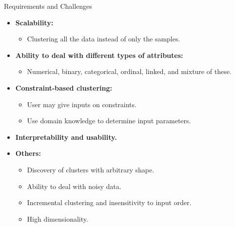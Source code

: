 \begin{frame}{Requirements and Challenges}
	\begin{itemize}
		\item \textbf{Scalability:}
		      \begin{itemize}
			      \item Clustering all the data instead of only the samples.
		      \end{itemize}
		\item \textbf{Ability to deal with different types of attributes:}
		      \begin{itemize}
			      \item Numerical, binary, categorical, ordinal, linked, and mixture
			            of these.
		      \end{itemize}
		\item \textbf{Constraint-based clustering:}
		      \begin{itemize}
			      \item User may give inputs on constraints.
			      \item Use domain knowledge to determine input parameters.
		      \end{itemize}
		\item \textbf{Interpretability and usability.}
		\item \textbf{Others:}
		      \begin{itemize}
			      \item Discovery of clusters with arbitrary shape.
			      \item Ability to deal with noisy data.
			      \item Incremental clustering and insensitivity to input order.
			      \item High dimensionality.
		      \end{itemize}
	\end{itemize}
\end{frame}

